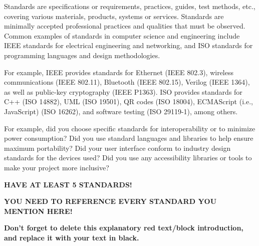 \begin{tcolorbox}[      %
    boxrule=0pt,        %
    colback=white,      %
    coltext=red         %
]                       %
    Standards are specifications or requirements, practices, guides, test methods, etc., covering various materials, products, systems or services. Standards are minimally accepted professional practices and qualities that must be observed. Common examples of standards in computer science and engineering include IEEE standards for electrical engineering and networking, and ISO standards for programming languages and design methodologies.
    \vspace{15pt}
    
    For example, IEEE provides standards for Ethernet (IEEE 802.3), wireless communications (IEEE 802.11), Bluetooth (IEEE 802.15), Verilog (IEEE 1364), as well as public-key cryptography (IEEE P1363). ISO provides standards for C++ (ISO 14882), UML (ISO 19501), QR codes (ISO 18004), ECMAScript (i.e., JavaScript) (ISO 16262), and software testing (ISO 29119-1), among others.
    \vspace{15pt}
    
    For example, did you choose specific standards for interoperability or to minimize power consumption? Did you use standard languages and libraries to help ensure maximum portability? Did your user interface conform to industry design standards for the devices used? Did you use any accessibility libraries or tools to make your project more inclusive?
    \vspace{15pt}

    \textbf{HAVE AT LEAST 5 STANDARDS!}
    \vspace{15pt}
    
    \textbf{YOU NEED TO REFERENCE EVERY STANDARD YOU MENTION HERE!}

    \vspace{15pt}       %
    \begin{center}      %
    \textbf{Don't forget to delete this explanatory red text/block introduction, and replace it with your text in black.}
    \end{center}        %
\end{tcolorbox}         %